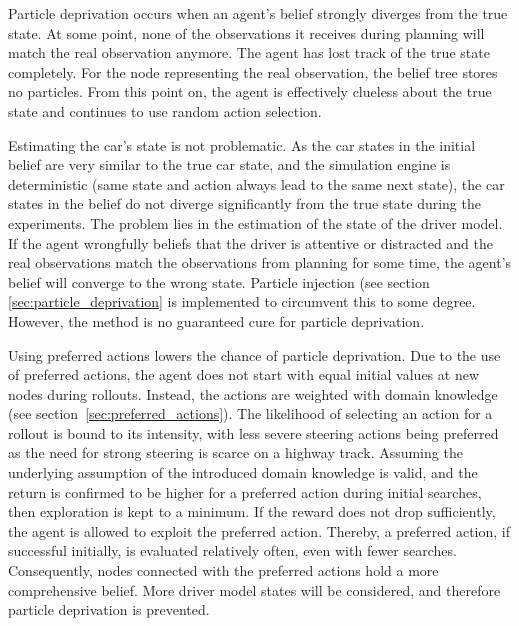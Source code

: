 Particle deprivation occurs when an agent's belief strongly diverges from the true state. At some point, none of the observations it receives during planning will match the real observation anymore. The agent has lost track of the true state completely. For the node representing the real observation, the belief tree stores no particles. From this point on, the agent is effectively clueless about the true state and continues to use random action selection.

Estimating the car's state is not problematic. As the car states in the initial belief are very similar to the true car state, and the simulation engine is deterministic (same state and action always lead to the same next state), the car states in the belief do not diverge significantly from the true state during the experiments. The problem lies in the estimation of the state of the driver model. If the agent wrongfully beliefs that the driver is attentive or distracted and the real observations match the observations from planning for some time, the agent's belief will converge to the wrong state. Particle injection (see section \ref{sec:particle_deprivation} is implemented to circumvent this to some degree. However, the method is no guaranteed cure for particle deprivation.

Using preferred actions lowers the chance of particle deprivation. Due to the use of preferred actions, the agent does not start with equal initial values at new nodes during rollouts. Instead, the actions are weighted with domain knowledge (see section~\ref{sec:preferred_actions}). The likelihood of selecting an action for a rollout is bound to its intensity, with less severe steering actions being preferred as the need for strong steering is scarce on a highway track. Assuming the underlying assumption of the introduced domain knowledge is valid, and the return is confirmed to be higher for a preferred action during initial searches, then exploration is kept to a minimum. If the reward does not drop sufficiently, the agent is allowed to exploit the preferred action. Thereby, a preferred action, if successful initially, is evaluated relatively often, even with fewer searches. Consequently, nodes connected with the preferred actions hold a more comprehensive belief. More driver model states will be considered, and therefore particle deprivation is prevented.


